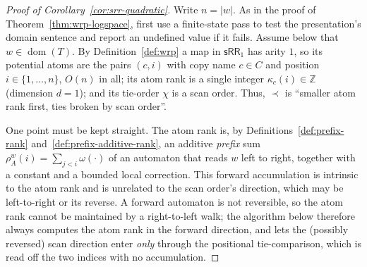 \documentclass[11pt]{article}
\theoremstyle{definition}
\newcommand{\Z}{\mathbb Z}
\newcommand{\SWR}{\mathsf{sRR}_1}
\begin{document}
\begin{proof}[Proof of Corollary~\ref{cor:srr-quadratic}]
Write $n=|w|$.  As in the proof of Theorem~\ref{thm:wrp-logspace}, first use a
finite-state pass to test the presentation's domain sentence and report an
undefined value if it fails.  Assume below that $w\in\operatorname{dom}(T)$.
By Definition~\ref{def:wrp} a map in $\SWR$ has arity
$1$, so its potential atoms are the pairs $(c,i)$ with copy name $c\in C$ and
position $i\in\{1,\ldots,n\}$, $O(n)$ in all; its atom rank is a single
integer $\kappa_c(i)\in\Z$ (dimension $d=1$); and its tie-order $\chi$ is a scan
order.  Thus, $\prec$ is ``smaller atom rank first, ties broken by scan order''.

One point must be kept straight.  The atom rank is, by
Definitions~\ref{def:prefix-rank} and~\ref{def:prefix-additive-rank}, an
additive \emph{prefix} sum
$\rho_A^w(i)=\sum_{j<i}\omega(\cdot)$ of an automaton that reads $w$ left to
right, together with a constant and a bounded local correction.  This forward
accumulation is intrinsic to the atom rank and is unrelated to the scan order's
direction, which may be left-to-right or its
reverse.  A forward automaton is not reversible, so the atom rank cannot be
maintained by a right-to-left walk; the algorithm below therefore always
computes the atom rank in the forward direction, and lets the (possibly reversed)
scan direction enter \emph{only} through the positional tie-comparison, which
is read off the two indices with no accumulation.


\end{proof}
\end{document}
